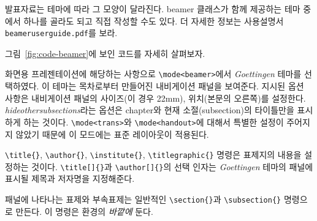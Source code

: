 발표자료는 테마에 따라 그 모양이 달라진다. beamer 클래스가 함께 제공하는 테마 중에서 하나를 골라도 되고 직접 작성할 수도 있다. 
더 자세한 정보는 사용설명서 \texttt{beameruserguide.pdf}를 보라.

그림~\ref{fig:code-beamer}에 보인 코드를 자세히 살펴보자.

화면용 프레젠테이션에 해당하는 사항으로 \verb|\mode<beamer>|에서 \emph{Goettingen} 테마를 선택하였다.
이 테마는 목차로부터 만들어진 내비게이션 패널을 보여준다. 
지시된 옵션 사항은 내비게이션 패널의 사이즈(이 경우 22mm), 위치(본문의 오른쪽)를 설정한다. \emph{hideothersubsections}라는 옵션은 chapter와 현재 소절(subsection)의 타이틀만을 표시하게 하는 것이다.
\verb|\mode<trans>|와 \verb|\mode<handout>|에 대해서 특별한 설정이 주어지지 않았기 때문에 이 모드에는 표준 레이아웃이 적용된다.

\verb|\title{}|, \verb|\author{}|, \verb|\institute{}|, \verb|\titlegraphic{}| 명령은 표제지의 내용을 설정하는 것이다. 
\verb|\title[]{}|과 \verb|\author[]{}|의 선택 인자는 \emph{Goettingen} 테마의 패널에 표시될 제목과 저자명을 지정해준다.

패널에 나타나는 표제와 부속표제는 일반적인 \verb|\section{}|과 \verb|\subsection{}| 명령으로 만든다. 이 명령은  환경의 \emph{바깥에} 둔다.

